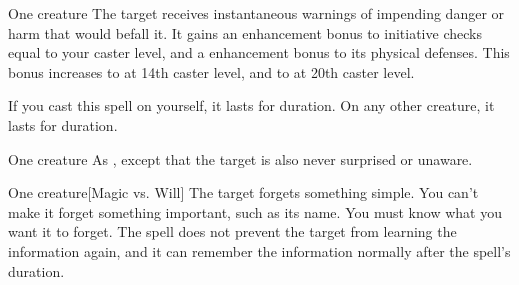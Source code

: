 \begin{spellheader}
\end{spellheader}
\begin{spelleffects}
    \begin{spelltarget}{One creature}
        \spelleffect The target receives instantaneous warnings of impending danger or harm that would befall it. It gains an enhancement bonus to initiative checks equal to your caster level, and a  enhancement bonus to its physical defenses. This bonus increases to  at 14th caster level, and to  at 20th caster level.
        \par If you cast this spell on yourself, it lasts for \durlong duration. On any other creature, it lasts for \durshort duration.
    \end{spelltarget}
\end{spelleffects}

\begin{spellheader}
\end{spellheader}
\begin{spelleffects}
    \begin{spelltarget}{One creature}
        \spelleffect As , except that the target is also never surprised or unaware.
    \end{spelltarget}
\end{spelleffects}

\begin{spellheader}
    \spellrng{\rngmed}
    \spelldur{\durlong}
\end{spellheader}
\begin{spelleffects}
    \begin{spelltarget}{One creature}[Magic vs. Will]
        \spelleffect The target forgets something simple. You can't make it forget something important, such as its name. You must know what you want it to forget. The spell does not prevent the target from learning the information again, and it can remember the information normally after the spell's duration.
    \end{spelltarget}
\end{spelleffects}

